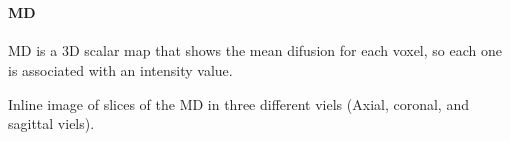 \documentclass[
	12pt,				%
	openright,			%
 twoside,			%
	letterpaper,		%
	english,			%
	brazil,				%
	sumario=tradicional,
	]{abntex2}
\begin{document}
    \begin{center}
    \end{center}
    { \hspace*{\fill} \\}
    
    \paragraph{MD}\label{md}

MD is a 3D scalar map that shows the mean difusion for each voxel, so
each one is associated with an intensity value.

Inline image of slices of the MD in three different viels (Axial,
coronal, and sagittal viels).
\end{document}
